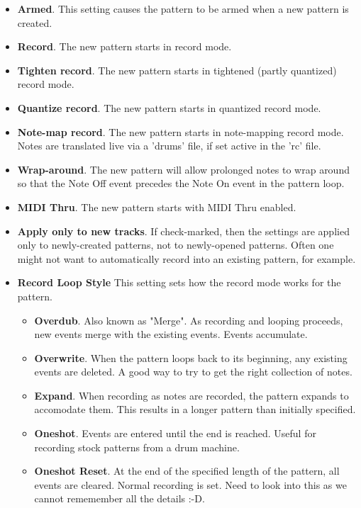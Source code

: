    \begin{itemize}
      \item \textbf{Armed}.
         This setting causes the pattern to be armed when a new pattern
         is created.
      \item \textbf{Record}.
         The new pattern starts in record mode.
      \item \textbf{Tighten record}.
         The new pattern starts in tightened (partly quantized) record mode.
      \item \textbf{Quantize record}.
         The new pattern starts in quantized record mode.
      \item \textbf{Note-map record}.
         The new pattern starts in note-mapping record mode.
         Notes are translated live via a 'drums' file, if set active
         in the 'rc' file.
      \item \textbf{Wrap-around}.
         The new pattern will allow prolonged notes to wrap around so
         that the Note Off event precedes the Note On event in the
         pattern loop.
      \item \textbf{MIDI Thru}.
         The new pattern starts with MIDI Thru enabled.
      \item \textbf{Apply only to new tracks}.
         If check-marked, then the settings are applied only to
         newly-created patterns, not to newly-opened patterns.
         Often one might not want to
         automatically record into an existing pattern, for example.
      \item \textbf{Record Loop Style}
         This setting sets how the record mode works for the pattern.
         \begin{itemize}
            \item \textbf{Overdub}.
               Also known as "Merge".
               As recording and looping proceeds, new events merge with
               the existing events.
               Events accumulate.
            \item \textbf{Overwrite}.
               When the pattern loops back to its beginning, any
               existing events are deleted.
               A good way to try to get the right collection of notes.
            \item \textbf{Expand}.
               When recording as notes are recorded, the pattern expands to
               accomodate them.
               This results in a longer pattern than initially specified.
            \item \textbf{Oneshot}.
               Events are entered until the end is reached.
               Useful for recording stock patterns from a drum machine.
            \item \textbf{Oneshot Reset}.
               At the end of the specified length of the pattern,
               all events are cleared.
               Normal recording is set.
               Need to look into this as we cannot rememember all the
               details :-D.
         \end{itemize}
   \end{itemize}

